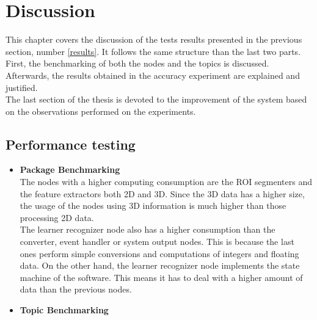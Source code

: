 \chapter{Discussion}
\label{discussion}

This chapter covers the discussion of the tests results presented in the previous section, number \ref{results}.
It follows the same structure than the last two parts. 
First, the benchmarking of both the nodes and the topics is discussed. 
Afterwards, the results obtained in the accuracy experiment are explained and justified. 
\\

The last section of the thesis is devoted to the improvement of the system based on the observations performed on the experiments. 

\section{Performance testing}

	\begin{itemize}
		\item{\textbf{Package Benchmarking}}
		\\

			The nodes with a higher computing consumption are the ROI segmenters and the feature extractors both 2D and 3D. 
			Since the 3D data has a higher size, the usage of the nodes using 3D information is much higher than those processing 2D data. 
			\\

			The learner recognizer node also has a higher consumption than the converter, event handler or system output nodes. 
			This is because the last ones perform simple conversions and computations of integers and floating data. 
			On the other hand, the learner recognizer node implements the state machine of the software. 
			This means it has to deal with a higher amount of data than the previous nodes. 




		\item{\textbf{Topic Benchmarking}}\\

	\end{itemize}